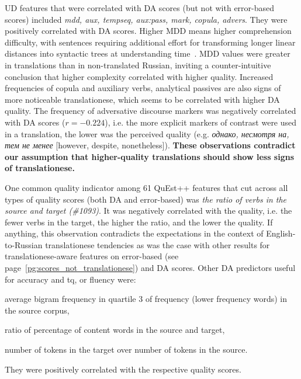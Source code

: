 UD features that were correlated with DA scores (but not with error-based scores) included \textit{mdd, aux, tempseq, aux:pass, mark, copula, advers}. They were positively correlated with DA scores. Higher MDD means higher comprehension difficulty, with sentences requiring additional effort for transforming longer linear distances into syntactic trees at understanding time~\cite[p.162]{Jing2015}. MDD values were greater in translations than in non-translated Russian, inviting a counter-intuitive conclusion that higher complexity correlated with higher quality. Increased frequencies of copula and auxiliary verbs, analytical passives are also signs of more noticeable translationese, which seems to be correlated with higher DA quality. The frequency of adversative discourse markers was negatively correlated with DA scores ($r=-0.224$), i.e. the more explicit markers of contrast were used in a translation, the lower was the perceived quality (e.g. \foreignlanguage{russian}{\textit{однако, несмотря на, тем не менее}} [however, despite, nonetheless]).
\textbf{These observations contradict our assumption that higher-quality translations should show less signs of translationese.}

One common quality indicator among 61 QuEst++ features that cut across all types of quality scores (both DA and error-based) was \textit{the ratio of verbs in the source and target (\#1093)}. It was negatively correlated with the quality, i.e. the fewer verbs in the target, the higher the ratio, and the lower the quality. %
If anything, this observation contradicts the expectations in the context of English-to-Russian translationese tendencies as was the case with other results for translationese-aware features on error-based (see page~\ref{pg:scores_not_translationese}) and DA scores. Other DA predictors useful for accuracy and tq, or fluency were: 
\begin{description}\compresslist{}
	\item[1052] average bigram frequency in quartile 3 of frequency (lower frequency words) in the source corpus,
	\item[1085] ratio of percentage of content words in the source and target,
	\item[1004] number of tokens in the target over number of tokens in the source.
\end{description}
They were positively correlated with the respective quality scores. 

